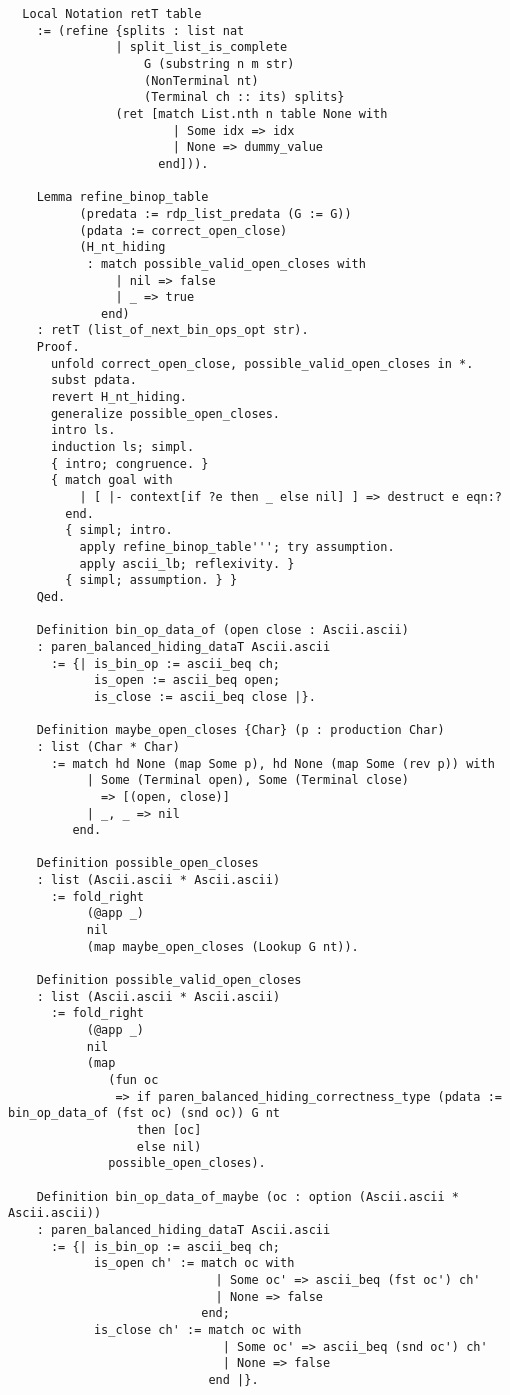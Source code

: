 \begin{verbatim}
  Local Notation retT table
    := (refine {splits : list nat
               | split_list_is_complete
                   G (substring n m str)
                   (NonTerminal nt)
                   (Terminal ch :: its) splits}
               (ret [match List.nth n table None with
                       | Some idx => idx
                       | None => dummy_value
                     end])).

    Lemma refine_binop_table
          (predata := rdp_list_predata (G := G))
          (pdata := correct_open_close)
          (H_nt_hiding
           : match possible_valid_open_closes with
               | nil => false
               | _ => true
             end)
    : retT (list_of_next_bin_ops_opt str).
    Proof.
      unfold correct_open_close, possible_valid_open_closes in *.
      subst pdata.
      revert H_nt_hiding.
      generalize possible_open_closes.
      intro ls.
      induction ls; simpl.
      { intro; congruence. }
      { match goal with
          | [ |- context[if ?e then _ else nil] ] => destruct e eqn:?
        end.
        { simpl; intro.
          apply refine_binop_table'''; try assumption.
          apply ascii_lb; reflexivity. }
        { simpl; assumption. } }
    Qed.

    Definition bin_op_data_of (open close : Ascii.ascii)
    : paren_balanced_hiding_dataT Ascii.ascii
      := {| is_bin_op := ascii_beq ch;
            is_open := ascii_beq open;
            is_close := ascii_beq close |}.

    Definition maybe_open_closes {Char} (p : production Char)
    : list (Char * Char)
      := match hd None (map Some p), hd None (map Some (rev p)) with
           | Some (Terminal open), Some (Terminal close)
             => [(open, close)]
           | _, _ => nil
         end.

    Definition possible_open_closes
    : list (Ascii.ascii * Ascii.ascii)
      := fold_right
           (@app _)
           nil
           (map maybe_open_closes (Lookup G nt)).

    Definition possible_valid_open_closes
    : list (Ascii.ascii * Ascii.ascii)
      := fold_right
           (@app _)
           nil
           (map
              (fun oc
               => if paren_balanced_hiding_correctness_type (pdata := bin_op_data_of (fst oc) (snd oc)) G nt
                  then [oc]
                  else nil)
              possible_open_closes).

    Definition bin_op_data_of_maybe (oc : option (Ascii.ascii * Ascii.ascii))
    : paren_balanced_hiding_dataT Ascii.ascii
      := {| is_bin_op := ascii_beq ch;
            is_open ch' := match oc with
                             | Some oc' => ascii_beq (fst oc') ch'
                             | None => false
                           end;
            is_close ch' := match oc with
                              | Some oc' => ascii_beq (snd oc') ch'
                              | None => false
                            end |}.


\end{verbatim}
